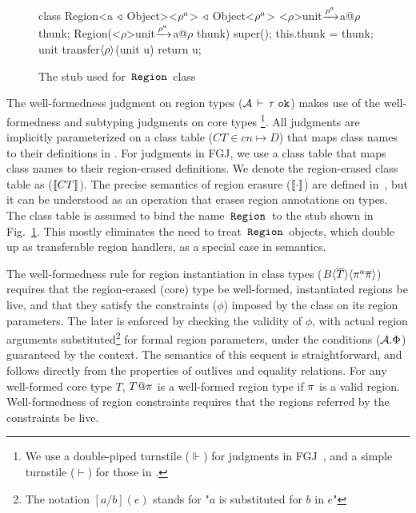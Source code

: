 \begin{figure}

\begin{codejava}
class Region<a $\triangleleft$ Object><${\rho^a}$> $\triangleleft$ Object<$\rho^a$>{
  <${\rho}$>unit$\xrightarrow{\rho^a}$a@$\rho$ thunk;
  Region(<${\rho}$>unit$\xrightarrow{\rho^a}$a@$\rho$ thunk) {
    super(); 
    this.thunk = thunk;
  }
  unit transfer$\langle \rho \rangle$(unit u) {
    return u;
  }
}
\end{codejava}

\caption{The stub used for $\,{\tt Region}\,$ class}
\label{fig:region-stub}
\end{figure}

\noindent The well-formedness judgment on region types
(${\mathcal{A}}\,\vdash\,\tau \; \texttt{ok}$) makes use of the well-formedness and subtyping
judgments on core types \footnote{We use a double-piped turnstile
($\Vdash$) for judgments in FGJ~\cite{fgj}, and a simple turnstile
($\vdash$) for those in \FB.}. All judgments are implicitly
parameterized on a class table ($CT \in cn \mapsto D$) that maps class
names to their definitions in \FB. For judgments in FGJ, we use a
class table that maps class names to their region-erased definitions.
We denote the region-erased class table as ($\llbracket CT \rrbracket$). The precise
semantics of region erasure ($\llbracket \cdot \rrbracket$) are defined
in~\cite{techrep}, but it can be understood as an operation that
erases region annotations on types. The class table is assumed to bind
the name $\,{\tt Region}\,$ to the stub shown in Fig.~\ref{fig:region-stub}.
This mostly eliminates the need to treat $\,{\tt Region}\,$ objects, which double
up as transferable region handlers, as a special case in semantics.

The well-formedness rule for region instantiation in class types
($B\langle \overline{T} \rangle\langle \pi^a\overline{\pi} \rangle$) requires that the region-erased
(core) type be well-formed, instantiated regions be live, and that
they satisfy the constraints ($\phi$) imposed by the class on its
region parameters. The later is enforced by checking the validity of
$\phi$, with actual region arguments substituted\footnote{The notation
$[a/b](e)$ stands for "$a$ is substituted for $b$ in $e$"} for formal
region parameters, under the conditions (${\mathcal{A}}.\Phi$) guaranteed by
the context. The semantics of this sequent is straightforward, and
follows directly from the properties of outlives and equality
relations. For any well-formed core type $T$, $T@\pi$ is a
well-formed region type if $\pi$ is a valid region. Well-formedness
of region constraints requires that the regions referred by the
constraints be live.

